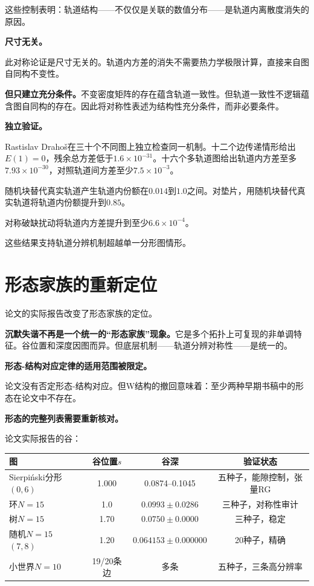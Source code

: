 \documentclass[11pt,a4paper]{book}
\theoremstyle{definition}
\begin{document}
这些控制表明：轨道结构——不仅仅是关联的数值分布——是轨道内离散度消失的原因。

\textbf{尺寸无关。}

此对称论证是尺寸无关的。轨道内方差的消失不需要热力学极限计算，直接来自图自同构不变性。

\textbf{但只建立充分条件。}不变密度矩阵的存在蕴含轨道一致性。但轨道一致性不逻辑蕴含图自同构的存在。因此将对称性表述为结构性充分条件，而非必要条件。

\textbf{独立验证。}

Rastislav Drahoš在三十个不同图上独立检查同一机制。十二个边传递情形给出$E(1)=0$，残余总方差低于$1.6\times10^{-31}$。十六个多轨道图给出轨道内方差至多$7.93\times10^{-30}$，对照轨道间方差至少$7.5\times10^{-3}$。

随机块替代真实轨道产生轨道内份额在$0.014$到$1.0$之间。对垫片，用随机块替代真实轨道将轨道内份额提升到$0.85$。

对称破缺扰动将轨道内方差提升到至少$6.6\times10^{-4}$。

这些结果支持轨道分辨机制超越单一分形图情形。

\section{形态家族的重新定位}

论文的实际报告改变了形态家族的定位。

\textbf{沉默失谐不再是一个统一的“形态家族”现象。}它是多个拓扑上可复现的非单调特征。谷位置和深度因图而异。但底层机制——轨道分辨对称性——是统一的。

\textbf{形态-结构对应定律的适用范围被限定。}

论文没有否定形态-结构对应。但W结构的撤回意味着：至少两种早期书稿中的形态在论文中不存在。

\textbf{形态的完整列表需要重新核对。}

论文实际报告的谷：

\begin{table}[h]
\centering
\begin{tabular}{lccc}
\toprule
图 & 谷位置$s$ & 谷深 & 验证状态 \\
\midrule
Sierpiński分形$(0,6)$ & 1.000 & 0.0874--0.1045 & 五种子，能隙控制，张量RG \\
环$N=15$ & 1.0 & $0.0993\pm0.0286$ & 三种子，对称性审计 \\
树$N=15$ & 1.70 & $0.0750\pm0.0000$ & 三种子，稳定 \\
随机$N=15$ $(7,8)$ & 1.20 & $0.064153\pm0.000000$ & 20种子，精确 \\
小世界$N=10$ & 19/20条边 & 多条 & 五种子，三条高分辨率 \\
\bottomrule
\end{tabular}
\end{table}
\end{document}
